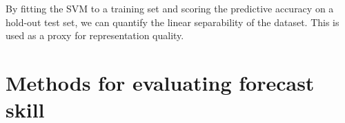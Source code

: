 By fitting the SVM to a training set and scoring the predictive accuracy on a hold-out test set, we can quantify the linear separability of the dataset. This is used as a proxy for representation quality.


\section{Methods for evaluating forecast skill}
